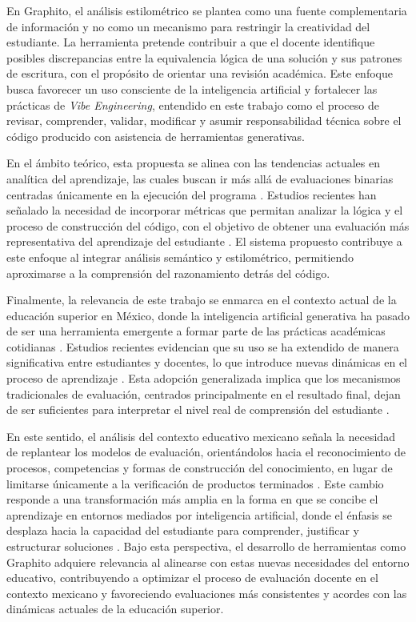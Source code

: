En Graphito, el análisis estilométrico se plantea como una fuente complementaria de información y no como un mecanismo para restringir la creatividad del estudiante. La herramienta pretende contribuir a que el docente identifique posibles discrepancias entre la equivalencia lógica de una solución y sus patrones de escritura, con el propósito de orientar una revisión académica. Este enfoque busca favorecer un uso consciente de la inteligencia artificial y fortalecer las prácticas de \textit{Vibe Engineering}, entendido en este trabajo como el proceso de revisar, comprender, validar, modificar y asumir responsabilidad técnica sobre el código producido con asistencia de herramientas generativas.

En el ámbito teórico, esta propuesta se alinea con las tendencias actuales en analítica del aprendizaje, las cuales buscan ir más allá de evaluaciones binarias centradas únicamente en la ejecución del programa \cite{openai2024chatgpt}. Estudios recientes han señalado la necesidad de incorporar métricas que permitan analizar la lógica y el proceso de construcción del código, con el objetivo de obtener una evaluación más representativa del aprendizaje del estudiante \cite{openai2024chatgpt}. El sistema propuesto contribuye a este enfoque al integrar análisis semántico y estilométrico, permitiendo aproximarse a la comprensión del razonamiento detrás del código.

Finalmente, la relevancia de este trabajo se enmarca en el contexto actual de la educación superior en México, donde la inteligencia artificial generativa ha pasado de ser una herramienta emergente a formar parte de las prácticas académicas cotidianas \cite{github2024state}. Estudios recientes evidencian que su uso se ha extendido de manera significativa entre estudiantes y docentes, lo que introduce nuevas dinámicas en el proceso de aprendizaje \cite{stackoverflow2024developer}. Esta adopción generalizada implica que los mecanismos tradicionales de evaluación, centrados principalmente en el resultado final, dejan de ser suficientes para interpretar el nivel real de comprensión del estudiante \cite{power2020decision}.

En este sentido, el análisis del contexto educativo mexicano señala la necesidad de replantear los modelos de evaluación, orientándolos hacia el reconocimiento de procesos, competencias y formas de construcción del conocimiento, en lugar de limitarse únicamente a la verificación de productos terminados \cite{sep2025usos}. Este cambio responde a una transformación más amplia en la forma en que se concibe el aprendizaje en entornos mediados por inteligencia artificial, donde el énfasis se desplaza hacia la capacidad del estudiante para comprender, justificar y estructurar soluciones \cite{sep2025usos}. Bajo esta perspectiva, el desarrollo de herramientas como Graphito adquiere relevancia al alinearse con estas nuevas necesidades del entorno educativo, contribuyendo a optimizar el proceso de evaluación docente en el contexto mexicano y favoreciendo evaluaciones más consistentes y acordes con las dinámicas actuales de la educación superior.



